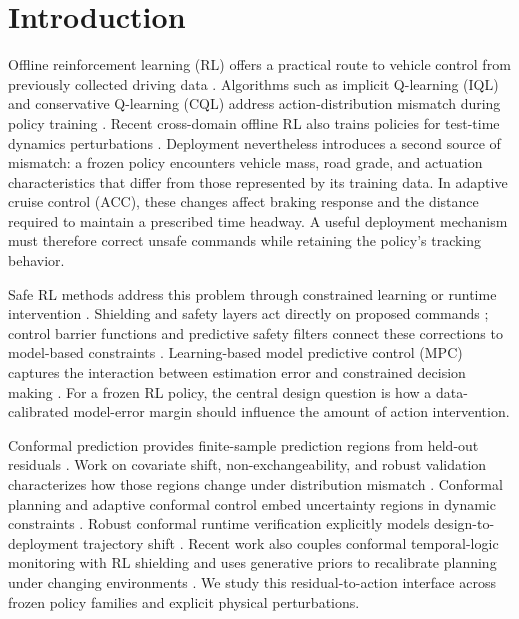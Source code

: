 \section{Introduction}
Offline reinforcement learning (RL) offers a practical route to vehicle
control from previously collected driving data \cite{levine2020offline}.
Algorithms such as implicit Q-learning (IQL) and conservative Q-learning
(CQL) address action-distribution mismatch during policy training
\cite{kostrikov2022iql,kumar2020cql}. Recent cross-domain offline RL also
trains policies for test-time dynamics perturbations \cite{qiao2026droco}.
Deployment nevertheless introduces a second source of mismatch: a frozen
policy encounters vehicle mass, road grade, and actuation
characteristics that differ from those represented by its training data.
In adaptive cruise control (ACC), these changes affect braking response and
the distance required to maintain a prescribed time headway. A useful
deployment mechanism must therefore correct unsafe commands while retaining
the policy's tracking behavior.

Safe RL methods address this problem through constrained learning or runtime
intervention \cite{brunke2022safe}.
Shielding and safety layers act directly on proposed commands
\cite{alshiekh2018shielding,dalal2018safe}; control barrier functions and
predictive safety filters connect these corrections to model-based
constraints \cite{ames2017cbf,wabersich2021psf}.
Learning-based model predictive control (MPC) captures the interaction
between estimation error and constrained decision making
\cite{aswani2013lbmpc}. For a frozen RL policy, the central
design question is how a data-calibrated model-error margin should influence
the amount of action intervention.

Conformal prediction provides finite-sample prediction regions from held-out
residuals \cite{vovk2005algorithmic,angelopoulos2023gentle}. Work on
covariate shift, non-exchangeability, and robust validation characterizes
how those regions change under distribution mismatch
\cite{tibshirani2019covariate,barber2023beyond,cauchois2024robust}.
Conformal planning and adaptive conformal control embed uncertainty regions
in dynamic constraints \cite{lindemann2023safeplanning,zhou2024safetycritical}.
Robust conformal runtime verification explicitly models design-to-deployment
trajectory shift \cite{zhao2024robuststl}.
Recent work also couples conformal temporal-logic monitoring with RL
shielding \cite{beirami2026} and uses generative priors to recalibrate
planning under changing environments \cite{rahaman2026shift}.
We study this residual-to-action interface across frozen policy families
and explicit physical perturbations.

